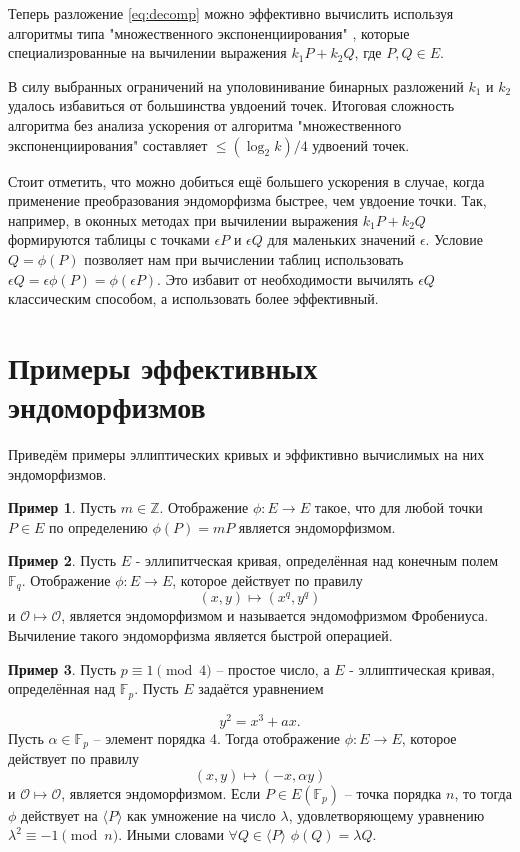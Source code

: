 \documentclass[a4paper,12pt]{article}
\theoremstyle{definition}
\theoremstyle{underline}
\newtheorem{example}{Пример}
\begin{document}
	Теперь разложение \ref{eq:decomp} можно эффективно вычислить используя алгоритмы типа "множественного экспоненциирования" \cite{moller2001algorithms}, которые специализрованные на вычилении выражения $k_1 P + k_2 Q$, где $P, Q \in E$.
	
	В силу выбранных ограничений на уполовинивание бинарных разложений $k_1$ и $k_2$ удалось избавиться от большинства увдоений точек. Итоговая сложность алгоритма без анализа ускорения от алгоритма "множественного экспоненциирования" составляет $\leqslant (\log_2 k) / 4$ удвоений точек.
	
	Стоит отметить, что можно добиться ещё большего ускорения в случае, когда применение преобразования эндоморфизма быстрее, чем увдоение точки. Так, например, в оконных методах при вычилении выражения $k_1 P + k_2 Q$ формируются таблицы с точками $\epsilon P$ и $\epsilon Q$ для маленьких значений $\epsilon$. Условие $Q=\phi (P)$ позволяет нам при вычислении таблиц использовать $\epsilon Q = \epsilon \phi (P) = \phi (\epsilon P)$. Это избавит от необходимости вычилять $\epsilon Q$ классическим способом, а использовать более эффективный.
	
	
	\newpage	
	\section{Примеры эффективных эндоморфизмов}
	
	Приведём примеры эллиптических кривых и эффиктивно вычислимых на них эндоморфизмов. 
	
	\begin{example}
		Пусть $m\in \mathbb{Z}$. Отображение $\phi: E \rightarrow E$ такое, что для любой точки $P \in E$ по определению $\phi(P) = m P$ является эндоморфизмом.
	\end{example}
	
	\begin{example}
		Пусть $E$ - эллипитческая кривая, определённая над конечным полем $\mathbb{F}_q$. Отображение $\phi: E \rightarrow E$, которое действует по правилу  \[(x, y) \mapsto (x^q, y^q)\] и $\mathcal{O} \mapsto \mathcal{O}$, является эндоморфизмом и называется эндомофризмом Фробениуса. Вычиление такого эндоморфизма является быстрой операцией.
	\end{example}

	\begin{example}
		Пусть $p \equiv 1 \pmod{4}$ -- простое число, а $E$ - эллиптическая кривая, определённая над $\mathbb{F}_p$. Пусть $E$ задаётся уравнением 
	
		\begin{equation}
			y^2 = x^3 + a x.
		\end{equation}
		Пусть $\alpha \in \mathbb{F}_p$ -- элемент порядка 4. Тогда отображение $\phi: E \rightarrow E$, которое действует по правилу  
		\[ (x, y) \mapsto (-x, \alpha y) \] 
		и $\mathcal{O} \mapsto \mathcal{O}$, является эндоморфизмом. Если $P \in E(\mathbb{F}_p)$ -- точка порядка $n$, то тогда $\phi$ действует на $\langle P\rangle$ как умножение на число $\lambda$, удовлетворяющему уравнению $\lambda^2 \equiv -1 \pmod{n}$. Иными словами $\forall Q \in \langle P\rangle$ $\phi(Q) = \lambda Q$.
	
	\end{example}
\end{document}
